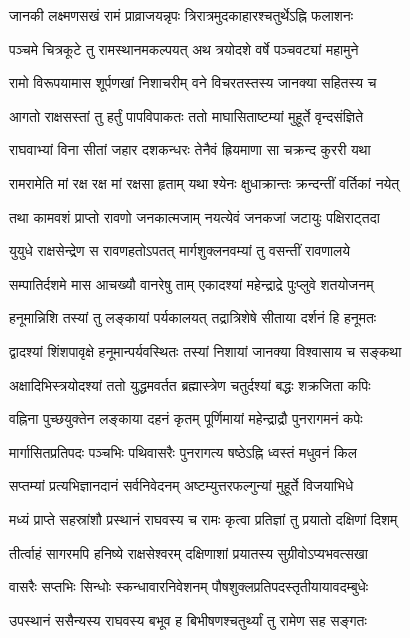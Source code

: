 \twolineshloka
{जानकी लक्ष्मणसखं रामं प्राव्राजयन्नृपः}
{त्रिरात्रमुदकाहारश्चतुर्थेऽह्नि फलाशनः}%

\twolineshloka
{पञ्चमे चित्रकूटे तु रामस्थानमकल्पयत्}
{अथ त्रयोदशे वर्षे पञ्चवट्यां महामुने}%

\twolineshloka
{रामो विरूपयामास शूर्पणखां निशाचरीम्}
{वने विचरतस्तस्य जानक्या सहितस्य च}%

\twolineshloka
{आगतो राक्षसस्तां तु हर्तुं पापविपाकतः}
{ततो माघासिताष्टम्यां मुहूर्ते वृन्दसंज्ञिते}%

\twolineshloka
{राघवाभ्यां विना सीतां जहार दशकन्धरः}
{तेनैवं ह्रियमाणा सा चक्रन्द कुररी यथा}%

\twolineshloka
{रामरामेति मां रक्ष रक्ष मां रक्षसा हृताम्}
{यथा श्येनः क्षुधाक्रान्तः क्रन्दन्तीं वर्तिकां नयेत्}%

\twolineshloka
{तथा कामवशं प्राप्तो रावणो जनकात्मजाम्}
{नयत्येवं जनकजां जटायुः पक्षिराट्तदा}%

\twolineshloka
{युयुधे राक्षसेन्द्रेण स रावणहतोऽपतत्}
{मार्गशुक्लनवम्यां तु वसन्तीं रावणालये}%

\twolineshloka
{सम्पातिर्दशमे मास आचख्यौ वानरेषु ताम्}
{एकादश्यां महेन्द्राद्रे पुःप्लुवे शतयोजनम्}%

\twolineshloka
{हनूमान्निशि तस्यां तु लङ्कायां पर्यकालयत्}
{तद्रात्रिशेषे सीताया दर्शनं हि हनूमतः}%

\twolineshloka
{द्वादश्यां शिंशपावृक्षे हनूमान्पर्यवस्थितः}
{तस्यां निशायां जानक्या विश्वासाय च सङ्कथा}%

\twolineshloka
{अक्षादिभिस्त्रयोदश्यां ततो युद्धमवर्तत}
{ब्रह्मास्त्रेण चतुर्दश्यां बद्धः शक्रजिता कपिः}%

\twolineshloka
{वह्निना पुच्छयुक्तेन लङ्काया दहनं कृतम्}
{पूर्णिमायां महेन्द्राद्रौ पुनरागमनं कपेः}%

\twolineshloka
{मार्गासितप्रतिपदः पञ्चभिः पथिवासरैः}
{पुनरागत्य षष्ठेऽह्नि ध्वस्तं मधुवनं किल}%

\twolineshloka
{सप्तम्यां प्रत्यभिज्ञानदानं सर्वनिवेदनम्}
{अष्टम्युत्तरफल्गुन्यां मुहूर्ते विजयाभिधे}%

\twolineshloka
{मध्यं प्राप्ते सहस्रांशौ प्रस्थानं राघवस्य च}
{रामः कृत्वा प्रतिज्ञां तु प्रयातो दक्षिणां दिशम्}%

\twolineshloka
{तीर्त्वाहं सागरमपि हनिष्ये राक्षसेश्वरम्}
{दक्षिणाशां प्रयातस्य सुग्रीवोऽप्यभवत्सखा}%

\twolineshloka
{वासरैः सप्तभिः सिन्धोः स्कन्धावारनिवेशनम्}
{पौषशुक्लप्रतिपदस्तृतीयायावदम्बुधेः}%

\twolineshloka
{उपस्थानं ससैन्यस्य राघवस्य बभूव ह}
{बिभीषणश्चतुर्थ्यां तु रामेण सह सङ्गतः}%

